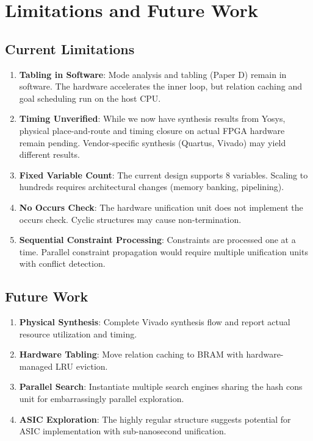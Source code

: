 \documentclass[11pt,a4paper]{article}
\begin{document}
\section{Limitations and Future Work}
\label{sec:limitations_chirho}

\subsection{Current Limitations}
\label{subsec:current_limits_chirho}

\begin{enumerate}
  \item \textbf{Tabling in Software}: Mode analysis and tabling (Paper D) remain
    in software. The hardware accelerates the inner loop, but relation caching
    and goal scheduling run on the host CPU.

  \item \textbf{Timing Unverified}: While we now have synthesis results from Yosys,
    physical place-and-route and timing closure on actual FPGA hardware remain pending.
    Vendor-specific synthesis (Quartus, Vivado) may yield different results.

  \item \textbf{Fixed Variable Count}: The current design supports 8 variables.
    Scaling to hundreds requires architectural changes (memory banking, pipelining).

  \item \textbf{No Occurs Check}: The hardware unification unit does not implement
    the occurs check. Cyclic structures may cause non-termination.

  \item \textbf{Sequential Constraint Processing}: Constraints are processed
    one at a time. Parallel constraint propagation would require multiple
    unification units with conflict detection.
\end{enumerate}

\subsection{Future Work}
\label{subsec:future_chirho}

\begin{enumerate}
  \item \textbf{Physical Synthesis}: Complete Vivado synthesis flow and report
    actual resource utilization and timing.

  \item \textbf{Hardware Tabling}: Move relation caching to BRAM with
    hardware-managed LRU eviction.

  \item \textbf{Parallel Search}: Instantiate multiple search engines sharing
    the hash cons unit for embarrassingly parallel exploration.

  \item \textbf{ASIC Exploration}: The highly regular structure suggests
    potential for ASIC implementation with sub-nanosecond unification.
\end{enumerate}
\end{document}
